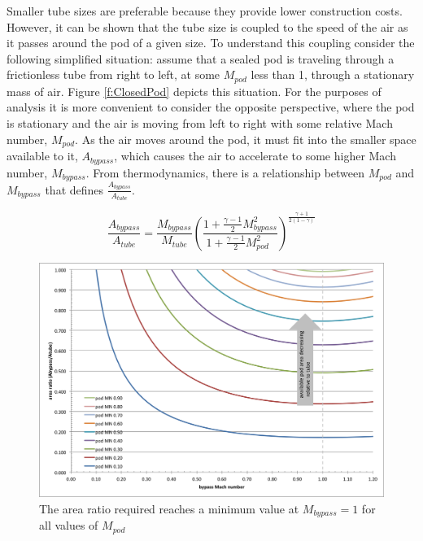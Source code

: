 \documentclass[heading.tex]{subfiles}
\begin{document}
Smaller tube sizes are preferable because they provide lower construction costs. However, it can be shown that 
the tube size is coupled to the speed of the air as it passes around the pod of a given size. 
To understand this coupling consider the following simplified situation: assume that a sealed pod
is traveling through a frictionless tube from right to left, at some $M_{pod}$ less than 1, through a stationary mass of air. 
Figure \ref{f:ClosedPod} depicts this situation. For the purposes of analysis it is more convenient to consider the opposite perspective, 
where the pod is stationary and the air is moving from left to right with some relative Mach number, $M_{pod}$. 
As the air moves around the pod, it must fit into the smaller space available to it, $A_{bypass}$, which causes the air 
to accelerate to some higher Mach number, $M_{bypass}$. From thermodynamics, there is a relationship between 
$M_{pod}$ and $M_{bypass}$ that defines $\frac{A_{bypass}}{A_{tube}}$.

\begin{equation}
\frac{A_{bypass}}{A_{tube}} = \frac{M_{bypass}}{M_{tube}}
\left(\frac{1+ \frac{\gamma-1}{2} M_{bypass}^2}
{1+ \frac{\gamma-1}{2} M_{pod\ \ \ }^2}\right)^{\frac{\gamma+1}{2\left(1-\gamma\right)}}
\label{e:a-over-astar}
\end{equation}

\begin{figure}[!htb]
  \centering
  \includegraphics[width=.9\textwidth]{images/choked-flow}
  \caption{The area ratio required reaches a minimum value at $M_{bypass}=1$ for all values of $M_{pod}$}
  \label{f:choked-flow}
\end{figure}
\end{document}
